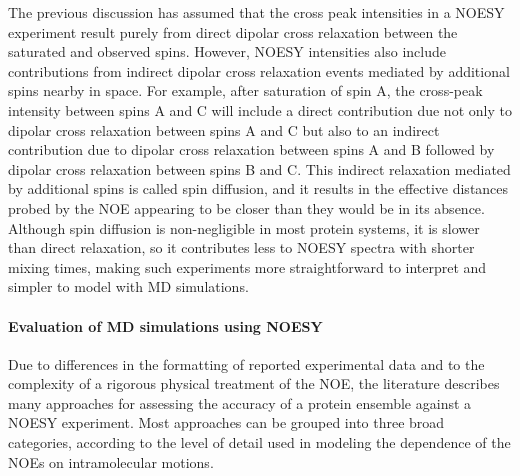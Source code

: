 \documentclass[9pt,review]{livecoms}
\begin{document}
The previous discussion has assumed that the cross peak intensities in a NOESY experiment result purely from direct dipolar cross relaxation between the saturated and observed spins.
However, NOESY intensities also include contributions from indirect dipolar cross relaxation events mediated by additional spins nearby in space.
For example, after saturation of spin A, the cross-peak intensity between spins A and C will include a direct contribution due not only to dipolar cross relaxation between spins A and C but also to an indirect contribution due to dipolar cross relaxation between spins A and B followed by dipolar cross relaxation between spins B and C.
This indirect relaxation mediated by additional spins is called spin diffusion, and it results in the effective distances probed by the NOE appearing to be closer than they would be in its absence.
Although spin diffusion is non-negligible in most protein systems, it is slower than direct relaxation, so it contributes less to NOESY spectra with shorter mixing times, making such experiments more straightforward to interpret and simpler to model with MD simulations.

\paragraph{Evaluation of MD simulations using NOESY}

Due to differences in the formatting of reported experimental data and to the complexity of a rigorous physical treatment of the NOE, the literature describes many approaches for assessing the accuracy of a protein ensemble against a NOESY experiment.
Most approaches can be grouped into three broad categories, according to the level of detail used in modeling the dependence of the NOEs on intramolecular motions. 
\end{document}
